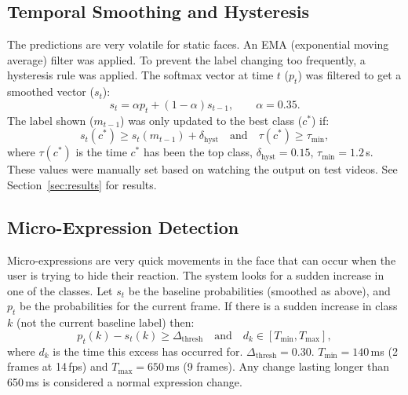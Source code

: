 \documentclass[conference]{IEEEtran}
\begin{document}
\subsection{Temporal Smoothing and Hysteresis}
The predictions are very volatile for static faces. An EMA (exponential moving average) filter was applied. To prevent the label changing too frequently, a hysteresis rule was applied. The softmax vector at time $t$ ($p_t$) was filtered to get a smoothed vector ($s_t$):
\begin{equation}
s_t = \alpha p_t + (1 - \alpha) s_{t-1}, \qquad \alpha = 0.35.
\end{equation}
The label shown ($m_{t-1}$) was only updated to the best class ($c^*$) if:
\begin{equation}
s_t(c^*) \ge s_t(m_{t-1}) + \delta_{\text{hyst}} \quad \text{and} \quad \tau(c^*) \ge \tau_{\text{min}},
\end{equation}
where $\tau(c^*)$ is the time $c^*$ has been the top class, $\delta_{\text{hyst}} = 0.15$, $\tau_{\text{min}} = 1.2$\,s. These values were manually set based on watching the output on test videos. See Section~\ref{sec:results} for results.

\subsection{Micro-Expression Detection}
Micro-expressions are very quick movements in the face that can occur when the user is trying to hide their reaction. The system looks for a sudden increase in one of the classes. Let $s_t$ be the baseline probabilities (smoothed as above), and $p_t$ be the probabilities for the current frame. If there is a sudden increase in class $k$ (not the current baseline label) then:
\begin{equation}
p_t(k) - s_t(k) \ge \Delta_{\text{thresh}} \quad \text{and} \quad d_k \in [T_{\text{min}}, T_{\text{max}}],
\end{equation}
where $d_k$ is the time this excess has occurred for. $\Delta_{\text{thresh}} = 0.30$. $T_{\text{min}} = 140$\,ms (2 frames at 14\,fps) and $T_{\text{max}} = 650$\,ms (9 frames). Any change lasting longer than 650\,ms is considered a normal expression change.
\end{document}

